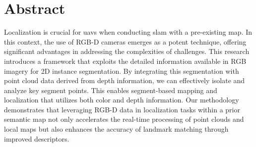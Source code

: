 \section*{Abstract}
Localization is crucial for \acrfull{uavs} when conducting \acrfull{slam} with a pre-existing map. In this context, the use of RGB-D cameras emerges as a potent technique, offering significant advantages in addressing the complexities of  challenges. This research introduces a framework that exploits the detailed information available in RGB imagery for 2D instance segmentation. By integrating this segmentation with point cloud data derived from depth information, we can effectively isolate and analyze key segment points. This enables segment-based mapping and localization that utilizes both color and depth information. Our methodology demonstrates that leveraging RGB-D data in localization tasks within a prior semantic map not only accelerates the real-time processing of point clouds and local maps but also enhances the accuracy of landmark matching through improved descriptors.





